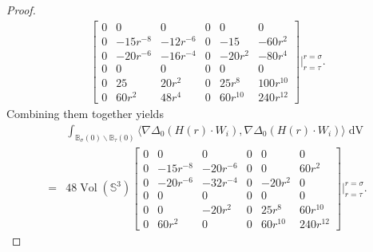 \documentclass[11pt,letterpaper]{amsart}
\DeclareMathOperator{\Vol}{Vol}
\DeclareMathOperator{\dvol}{dV}
\newcommand{\bB}{\mathbb{B}}
\newcommand{\bS}{\mathbb{S}}
\theoremstyle{definition}
\theoremstyle{remark}
\numberwithin{equation}{section}
\begin{document}
\begin{proof}
\begin{equation}
\begin{split}
\begin{bmatrix}
0 & 0 & 0 & 0 & 0& 0\\
0 & -15r^{-8} & -12r^{-6} & 0 & -15& -60r^2\\
0 & -20r^{-6} & -16r^{-4}& 0& -20r^2 & -80r^4\\
0 & 0 & 0 & 0 & 0& 0\\
0 & 25 & 20r^2 & 0 & 25r^8& 100r^{10}\\
0 & 60r^2 & 48r^4 & 0 & 60r^{10}& 240r^{12}
\end{bmatrix}\Big|_{r=\tau}^{r=\sigma}.
    \end{split}
\end{equation}
Combining them together yields
\begin{equation}
\begin{split}
    &\int_{\bB_{\sigma}(0)\backslash \bB_{\tau}(0)}\langle \nabla \Delta_0 (H(r)\cdot W_i), \nabla \Delta_0(H(r)\cdot W_i)\rangle \dvol\\
    =&48 \Vol(\bS^3) \begin{bmatrix}
0 & 0 & 0 & 0 & 0& 0\\
0 & -15r^{-8} & -20r^{-6} & 0 & 0& 60r^2\\
0 & -20r^{-6} & {-32r^{-4}}& 0& -20r^2 & 0\\
0 & 0 & 0 & 0 & 0& 0\\
0 & 0 & -20r^2 & 0 & 25r^8& 60r^{10}\\
0 & 60r^2 & 0 & 0 & 60r^{10}& 240r^{12}
\end{bmatrix}\Big|_{r=\tau}^{r=\sigma}.
\end{split}
\end{equation}
\end{proof}
\end{document}
